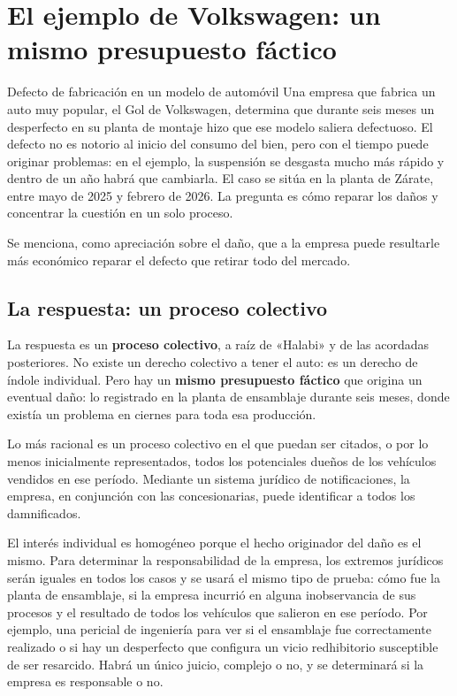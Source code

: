 \documentclass[12pt,oneside]{book}
\begin{document}
\section{El ejemplo de Volkswagen: un mismo presupuesto fáctico}

\begin{example}{Defecto de fabricación en un modelo de automóvil}
Una empresa que fabrica un auto muy popular, el Gol de Volkswagen, determina que durante seis meses un desperfecto en su planta de montaje hizo que ese modelo saliera defectuoso. El defecto no es notorio al inicio del consumo del bien, pero con el tiempo puede originar problemas: en el ejemplo, la suspensión se desgasta mucho más rápido y dentro de un año habrá que cambiarla. El caso se sitúa en la planta de Zárate, entre mayo de 2025 y febrero de 2026. La pregunta es cómo reparar los daños y concentrar la cuestión en un solo proceso.
\end{example}

Se menciona, como apreciación sobre el daño, que a la empresa puede resultarle más económico reparar el defecto que retirar todo del mercado.

\subsection{La respuesta: un proceso colectivo}

La respuesta es un \textbf{proceso colectivo}, a raíz de «Halabi» y de las acordadas posteriores. No existe un derecho colectivo a tener el auto: es un derecho de índole individual. Pero hay un \textbf{mismo presupuesto fáctico} que origina un eventual daño: lo registrado en la planta de ensamblaje durante seis meses, donde existía un problema en ciernes para toda esa producción.

Lo más racional es un proceso colectivo en el que puedan ser citados, o por lo menos inicialmente representados, todos los potenciales dueños de los vehículos vendidos en ese período. Mediante un sistema jurídico de notificaciones, la empresa, en conjunción con las concesionarias, puede identificar a todos los damnificados.

El interés individual es homogéneo porque el hecho originador del daño es el mismo. Para determinar la responsabilidad de la empresa, los extremos jurídicos serán iguales en todos los casos y se usará el mismo tipo de prueba: cómo fue la planta de ensamblaje, si la empresa incurrió en alguna inobservancia de sus procesos y el resultado de todos los vehículos que salieron en ese período. Por ejemplo, una pericial de ingeniería para ver si el ensamblaje fue correctamente realizado o si hay un desperfecto que configura un vicio redhibitorio susceptible de ser resarcido. Habrá un único juicio, complejo o no, y se determinará si la empresa es responsable o no.
\end{document}
